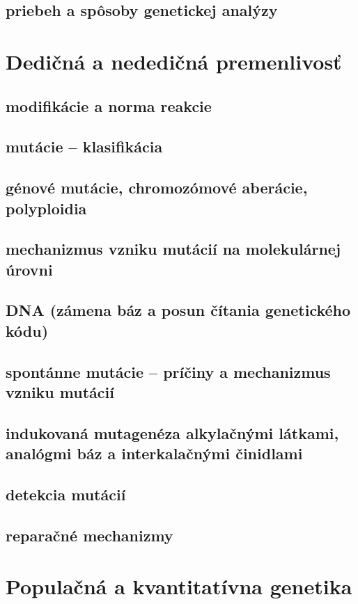 \subsection{priebeh a spôsoby genetickej analýzy}

\section{Dedičná a nededičná premenlivosť}
\subsection{modifikácie a norma reakcie}
\subsection{mutácie -- klasifikácia}
\subsection{génové mutácie, chromozómové aberácie, polyploidia}
\subsection{mechanizmus vzniku mutácií na molekulárnej úrovni}
\subsection{DNA (zámena báz a posun čítania genetického kódu)}
\subsection{spontánne mutácie -- príčiny a mechanizmus vzniku mutácií}
\subsection{indukovaná mutagenéza alkylačnými látkami, analógmi báz a interkalačnými činidlami}
\subsection{detekcia mutácií}
\subsection{reparačné mechanizmy}

\section{Populačná a kvantitatívna genetika}
